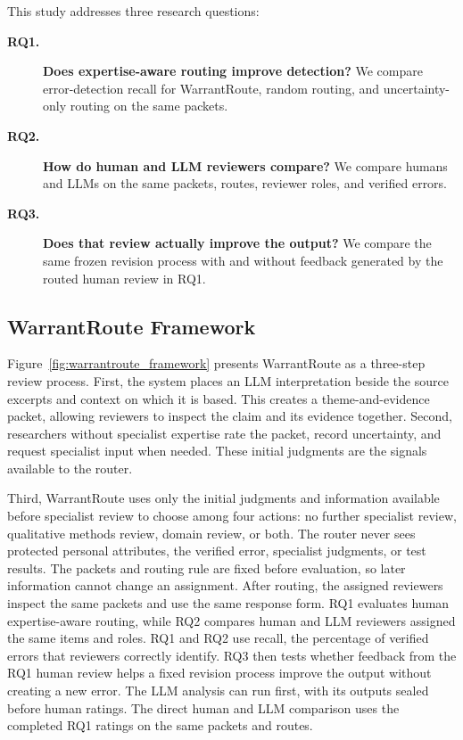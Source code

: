 This study addresses three research questions:
\begin{description}
    \item[\textbf{RQ1.}] \textbf{Does expertise-aware routing improve detection?} We compare error-detection recall for WarrantRoute, random routing, and uncertainty-only routing on the same packets.
    \item[\textbf{RQ2.}] \textbf{How do human and LLM reviewers compare?} We compare humans and LLMs on the same packets, routes, reviewer roles, and verified errors.
    \item[\textbf{RQ3.}] \textbf{Does that review actually improve the output?} We compare the same frozen revision process with and without feedback generated by the routed human review in RQ1.
\end{description}

\subsection{WarrantRoute Framework}
\label{sec:warrantroute_framework}

Figure~\ref{fig:warrantroute_framework} presents WarrantRoute as a three-step review process. First, the system places an LLM interpretation beside the source excerpts and context on which it is based. This creates a theme-and-evidence packet, allowing reviewers to inspect the claim and its evidence together. Second, researchers without specialist expertise rate the packet, record uncertainty, and request specialist input when needed. These initial judgments are the signals available to the router.

Third, WarrantRoute uses only the initial judgments and information available before specialist review to choose among four actions: no further specialist review, qualitative methods review, domain review, or both. The router never sees protected personal attributes, the verified error, specialist judgments, or test results. The packets and routing rule are fixed before evaluation, so later information cannot change an assignment. After routing, the assigned reviewers inspect the same packets and use the same response form. RQ1 evaluates human expertise-aware routing, while RQ2 compares human and LLM reviewers assigned the same items and roles. RQ1 and RQ2 use recall, the percentage of verified errors that reviewers correctly identify. RQ3 then tests whether feedback from the RQ1 human review helps a fixed revision process improve the output without creating a new error. The LLM analysis can run first, with its outputs sealed before human ratings. The direct human and LLM comparison uses the completed RQ1 ratings on the same packets and routes.

